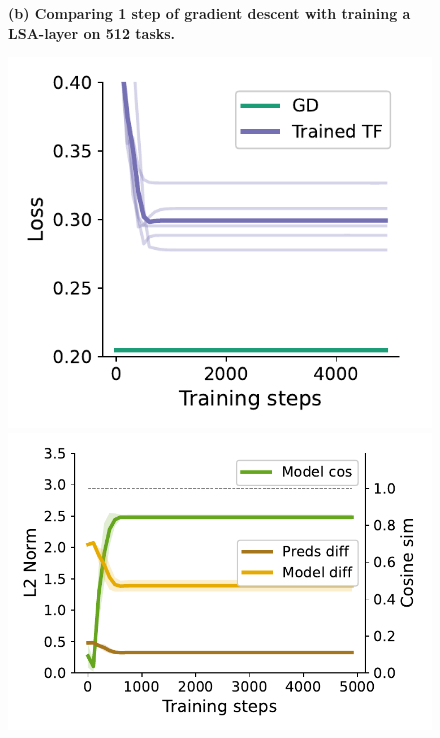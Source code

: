 \documentclass{article}
\theoremstyle{plain}
\theoremstyle{definition}
\theoremstyle{remark}
\begin{document}
\begin{figure}
\textbf{(b) Comparing 1 step of gradient descent with training a LSA-layer on 512 tasks.}

\begin{center}
\begin{minipage}{.24\textwidth}
  \centering
  \begin{center}
    \includegraphics[width=1.\textwidth]{Final_figures/cycle/512/train.pdf}
  \end{center}
  \vspace{-10pt}
\end{minipage}
\begin{minipage}{.24\textwidth}
  \centering
  \begin{center}
    \includegraphics[width=1.\textwidth]{Final_figures/cycle/512/sim.pdf}

\end{center}
\end{minipage}
\end{center}
\end{figure}
\end{document}
